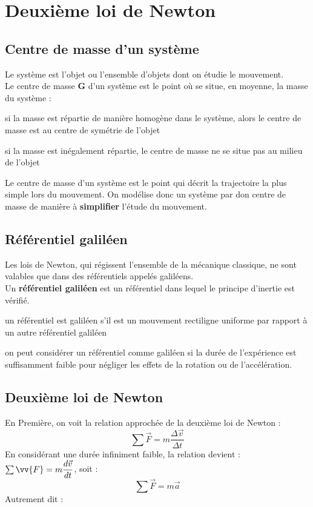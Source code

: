 \documentclass[a4paper,12pt,fleqn]{article}%
\begin{document}
\maketitle

\section{Deuxième loi de Newton}
	\subsection{Centre de masse d'un système}
Le système est l'objet ou l'ensemble d'objets dont on étudie le mouvement.\\
Le centre de masse \textbf{G} d'un système est le point où se situe, en moyenne, la masse du système :
\begin{itemize*}
	\item si la masse est répartie de manière homogène dans le système, alors le centre de masse est au centre de symétrie de l'objet
	\item si la masse est inégalement répartie, le centre de masse ne se situe pas au milieu de l'objet
\end{itemize*}
Le centre de masse d'un système est le point qui décrit la trajectoire la plus simple lors du mouvement. On modélise donc un système par don centre de masse de manière à \textbf{simplifier} l'étude du mouvement.
	\subsection{Référentiel galiléen}
Les lois de Newton, qui régissent l'ensemble  de la mécanique classique, ne sont valables que dans des référentiels appelés galiléens.\\
Un \textbf{référentiel galiléen} est un référentiel dans lequel le principe d'inertie est vérifié.
\begin{itemize*}
	\item un référentiel est galiléen s'il est un mouvement rectiligne uniforme par rapport à un autre référentiel galiléen
	\item on peut considérer un référentiel comme galiléen si la durée de l'expérience est suffisamment faible pour négliger les effets de la rotation ou de l'accélération.
\end{itemize*}
	\subsection{Deuxième loi de Newton}
En Première, on voit la relation approchée de la deuxième loi de Newton :
$$\sum \vec{F} = m \dfrac{\Delta \vec{v}}{\Delta t}$$
En considérant une durée infiniment faible, la relation devient : $\sum{\vv{F}} = m \dfrac{d \vec{v}}{dt}$, soit :
$$\sum \vec{F} = m \vec{a}$$
Autrement dit :\\
\end{document}
